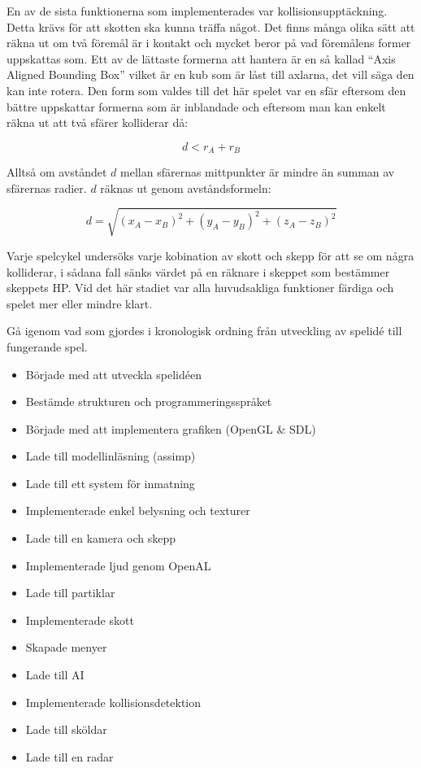 \documentclass[12pt, a4paper]{article}
\begin{document}
	En av de sista funktionerna som implementerades var kollisionsupptäckning. Detta krävs för att skotten ska kunna träffa något. Det finns många olika sätt att räkna ut om två föremål är i kontakt och mycket beror på vad föremålens former uppskattas som. Ett av de lättaste formerna att hantera är en så kallad ``Axis Aligned Bounding Box'' vilket är en kub som är låst till axlarna, det vill säga den kan inte rotera. Den form som valdes till det här spelet var en sfär eftersom den bättre uppskattar formerna som är inblandade och eftersom man kan enkelt räkna ut att två sfärer kolliderar då:
	
	\begin{equation}
		d < r_A + r_B
	\end{equation}
	
	Alltså om avståndet $d$ mellan sfärernas mittpunkter är mindre än summan av sfärernas radier. $d$ räknas ut genom avståndsformeln:
	
	\begin{equation}
		d = \sqrt{(x_A - x_B)^2 + (y_A - y_B)^2 + (z_A - z_B)^2}
	\end{equation}
	
	Varje spelcykel undersöks varje kobination av skott och skepp för att se om några kolliderar, i sådana fall sänks värdet på en räknare i skeppet som bestämmer skeppets HP. Vid det här stadiet var alla huvudsakliga funktioner färdiga och spelet mer eller mindre klart. 
	
	Gå igenom vad som gjordes i kronologisk ordning från utveckling av spelidé till fungerande spel. 
	
	\begin{itemize}
		\item Började med att utveckla spelidéen
		\item Bestämde strukturen och programmeringsspråket
		\item Började med att implementera grafiken (OpenGL \& SDL)
		\item Lade till modellinläsning (assimp)
		\item Lade till ett system för inmatning
		\item Implementerade enkel belysning och texturer
		\item Lade till en kamera och skepp
		\item Implementerade ljud genom OpenAL
		\item Lade till partiklar
		\item Implementerade skott
		\item Skapade menyer
		\item Lade till AI
		\item Implementerade kollisionsdetektion
		\item Lade till sköldar
		\item Lade till en radar
	\end{itemize}
	
\end{document}
